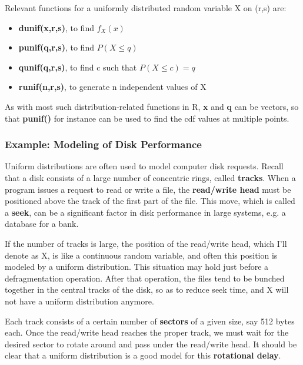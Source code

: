 Relevant functions for a uniformly  distributed random variable X 
on (r,s) are:

\begin{itemize}

\item {\bf dunif(x,r,s)}, to find $f_X(x)$

\item {\bf punif(q,r,s)}, to find $P(X \leq q)$

\item {\bf qunif(q,r,s)}, to find c such that $P(X \leq c) = q$

\item {\bf runif(n,r,s)}, to generate n independent values of X

\end{itemize}

As with most such distribution-related functions in R, {\bf x} and {\bf
q} can be vectors, so that {\bf punif()} for instance can be used to
find the cdf values at multiple points.

\subsubsection{Example:  Modeling of Disk Performance}

Uniform distributions are often used to model computer disk requests.
Recall that a disk consists of a large number of concentric rings,
called {\bf tracks}.  When a program issues a request to read or write a
file, the {\bf read/write head} must be positioned above the track of
the first part of the file.  This move, which is called a {\bf seek},
can be a significant factor in disk performance in large systems, e.g. a
database for a bank.

\label{defrag}
If the number of tracks is large, the position of the read/write head,
which I'll denote as X, is like a continuous random variable, and 
often this position is modeled by a uniform distribution.  This 
situation may hold just before a defragmentation operation.  After 
that operation, the files tend to be bunched together in the central 
tracks of the disk, so as to reduce seek time, and X will not have a
uniform distribution anymore.

Each track consists of a certain number of {\bf sectors} of a given
size, say 512 bytes each.  Once the read/write head reaches the proper
track, we must wait for the desired sector to rotate around and pass
under the read/write head.  It should be clear that a uniform
distribution is a good model for this {\bf rotational delay}.

